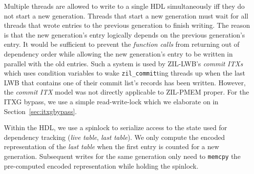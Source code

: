 \documentclass[12pt,a4paper,twoside]{book}
\begin{document}
Multiple threads are allowed to write to a single HDL simultaneously iff they do not start a new generation.
Threads that start a new generation must wait for all threads that wrote entries to the previous generation to finish writing.
The reason is that the new generation's entry logically depends on the previous generation's entry.
It would be sufficient to prevent the \textit{function calls} from returning out of dependency order while allowing the new generation's entry to be written in parallel with the old entries.
Such a system is used by ZIL-LWB's \textit{commit ITXs} which uses condition variables to wake \lstinline{zil_commit}ting threads up when the last LWB that contains one of their commit list's records has been written.
However, the \textit{commit ITX} model was not directly applicable to ZIL-PMEM proper.
For the ITXG bypass, we use a simple read-write-lock which we elaborate on in Section~\ref{sec:itxgbypass}.

Within the HDL, we use a spinlock to serialize access to the state used for dependency tracking (\textit{live table}, \textit{last table}).
We only compute the encoded representation of the \textit{last table} when the first entry is counted for a new generation.
Subsequent writes for the same generation only need to \lstinline{memcpy} the pre-computed encoded representation while holding the spinlock.
\end{document}
